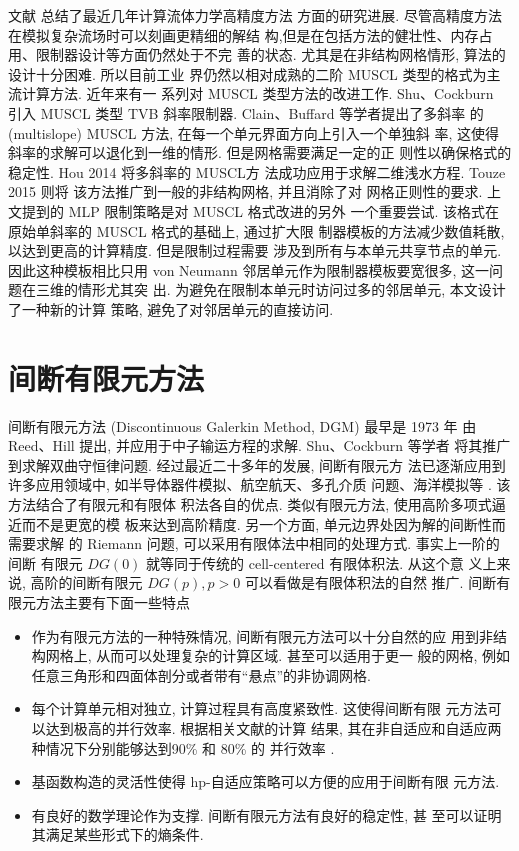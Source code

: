 文献 \cite{Wang2007,Wang2013} 总结了最近几年计算流体力学高精度方法
方面的研究进展. 尽管高精度方法在模拟复杂流场时可以刻画更精细的解结
构,但是在包括方法的健壮性、内存占用、限制器设计等方面仍然处于不完
善的状态. 尤其是在非结构网格情形, 算法的设计十分困难. 所以目前工业
界仍然以相对成熟的二阶 MUSCL 类型的格式为主流计算方法. 近年来有一
系列对 MUSCL 类型方法的改进工作. Shu、Cockburn
\cite{Cockburn1998} 引入 MUSCL 类型 TVB 斜率限制器.
Clain、Buffard \cite{Clain2010,Buffard2010} 等学者提出了多斜率
的 (multislope) MUSCL 方法, 在每一个单元界面方向上引入一个单独斜
率, 这使得斜率的求解可以退化到一维的情形. 但是网格需要满足一定的正
则性以确保格式的稳定性. Hou 2014 \cite{Hou2015} 将多斜率的 MUSCL方
法成功应用于求解二维浅水方程. Touze 2015
\cite{LeTouze2015} 则将 该方法推广到一般的非结构网格, 并且消除了对
网格正则性的要求. 上文提到的 MLP 限制策略是对 MUSCL 格式改进的另外
一个重要尝试. 该格式在原始单斜率的 MUSCL 格式的基础上, 通过扩大限
制器模板的方法减少数值耗散, 以达到更高的计算精度. 但是限制过程需要
涉及到所有与本单元共享节点的单元.  因此这种模板相比只用 von
Neumann 邻居单元作为限制器模板要宽很多, 这一问题在三维的情形尤其突
出. 为避免在限制本单元时访问过多的邻居单元, 本文设计了一种新的计算
策略, 避免了对邻居单元的直接访问.

\section{间断有限元方法}
\label{sec:dg-method}

间断有限元方法 (Discontinuous Galerkin Method, DGM) 最早是 1973 年
由 Reed、Hill \cite{Reed1973} 提出, 并应用于中子输运方程的求解.
Shu、Cockburn \cite{Cockburn1989,Cockburn1990,Cockburn1998} 等学者
将其推广到求解双曲守恒律问题. 经过最近二十多年的发展, 间断有限元方
法已逐渐应用到许多应用领域中, 如半导体器件模拟、航空航天、多孔介质
问题、海洋模拟等 \cite{liuruxun2003}.  该方法结合了有限元和有限体
积法各自的优点.  类似有限元方法, 使用高阶多项式逼近而不是更宽的模
板来达到高阶精度.  另一个方面, 单元边界处因为解的间断性而需要求解
的 Riemann 问题, 可以采用有限体法中相同的处理方式. 事实上一阶的间断
有限元 $DG(0)$ 就等同于传统的 cell-centered 有限体积法.  从这个意
义上来说, 高阶的间断有限元 $DG(p), p>0$ 可以看做是有限体积法的自然
推广. 间断有限元方法主要有下面一些特点
\begin{itemize}
\item 作为有限元方法的一种特殊情况, 间断有限元方法可以十分自然的应
  用到非结构网格上, 从而可以处理复杂的计算区域. 甚至可以适用于更一
  般的网格, 例如任意三角形和四面体剖分或者带有``悬点''的非协调网格.
\item 每个计算单元相对独立, 计算过程具有高度紧致性. 这使得间断有限
  元方法可以达到极高的并行效率\cite{Juan2009}. 根据相关文献的计算
  结果, 其在非自适应和自适应两种情况下分别能够达到90\% 和 80\% 的
  并行效率 \cite{Remacle2003,Biswas1994}.
\item 基函数构造的灵活性使得 hp-自适应策略可以方便的应用于间断有限
  元方法.
\item 有良好的数学理论作为支撑. 间断有限元方法有良好的稳定性, 甚
  至可以证明其满足某些形式下的熵条件\cite{Jiang1994,Hou2006}.
\end{itemize}

